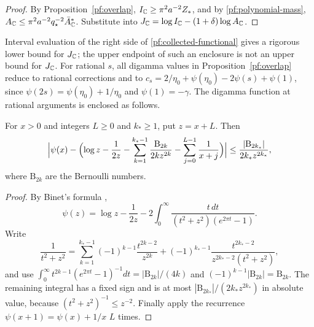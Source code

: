 \begin{proof}
By Proposition~\ref{pf:overlap}, $I_\mathbb C\ge\pi^2a^{-2}Z_*$, and by
\eqref{pf:polynomial-mass}, $A_\mathbb C\le\pi^2a^{-2}q_\star^{-2}\bar A_\mathbb C^*$.
Substitute into $J_\mathbb C=\log I_\mathbb C-(1+\delta)\log A_\mathbb C$.
\end{proof}

Interval evaluation of the right side of \eqref{pf:collected-functional}
gives a rigorous lower bound for $J_\mathbb C$; the upper endpoint of such an
enclosure is not an upper bound for $J_\mathbb C$. For rational $s$, all
digamma values in Proposition~\ref{pf:overlap} reduce to rational
corrections and to $c_s=2/\eta_0+\psi(\eta_0)-2\psi(s)+\psi(1)$, since
$\psi(2s)=\psi(\eta_0)+1/\eta_0$ and $\psi(1)=-\gamma$. The digamma
function at rational arguments is enclosed as follows.

\begin{lemma}\label{pf:digamma}
For $x>0$ and integers $L\ge0$ and $k_*\ge1$, put $z=x+L$. Then
\[
 \Bigl|\psi(x)-\Bigl(\log z-\frac1{2z}
 -\sum_{k=1}^{k_*-1}\frac{\mathrm B_{2k}}{2kz^{2k}}
 -\sum_{j=0}^{L-1}\frac1{x+j}\Bigr)\Bigr|
 \le\frac{|\mathrm B_{2k_*}|}{2k_*z^{2k_*}},
\]
where $\mathrm B_{2k}$ are the Bernoulli numbers.
\end{lemma}

\begin{proof}
By Binet's formula \cite[Equation~(5.9.15)]{DLMF},
\[
 \psi(z)=\log z-\frac1{2z}
 -2\int_0^\infty\frac{t\,dt}{(t^2+z^2)(e^{2\pi t}-1)} .
\]
Write
\[
 \frac1{t^2+z^2}=\sum_{k=1}^{k_*-1}(-1)^{k-1}\frac{t^{2k-2}}{z^{2k}}
 +(-1)^{k_*-1}\frac{t^{2k_*-2}}{z^{2k_*-2}(t^2+z^2)},
\]
and use $\int_0^\infty t^{2k-1}(e^{2\pi t}-1)^{-1}dt=|\mathrm B_{2k}|/(4k)$ and
$(-1)^{k-1}|\mathrm B_{2k}|=\mathrm B_{2k}$. The remaining integral has a fixed sign and
is at most $|\mathrm B_{2k_*}|/(2k_*z^{2k_*})$ in absolute value, because
$(t^2+z^2)^{-1}\le z^{-2}$. Finally apply the recurrence
$\psi(x+1)=\psi(x)+1/x$ $L$ times.
\end{proof}
